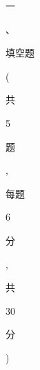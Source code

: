 \documentclass[10pt]{article}
\begin{document}
\begin{CJK}{UTF8}{mj}一\end{CJK}、\begin{CJK}{UTF8}{mj}填空题\end{CJK} (\begin{CJK}{UTF8}{mj}共\end{CJK} 5 \begin{CJK}{UTF8}{mj}题\end{CJK}, \begin{CJK}{UTF8}{mj}每题\end{CJK} 6 \begin{CJK}{UTF8}{mj}分\end{CJK}, \begin{CJK}{UTF8}{mj}共\end{CJK} 30 \begin{CJK}{UTF8}{mj}分\end{CJK})
\end{document}
